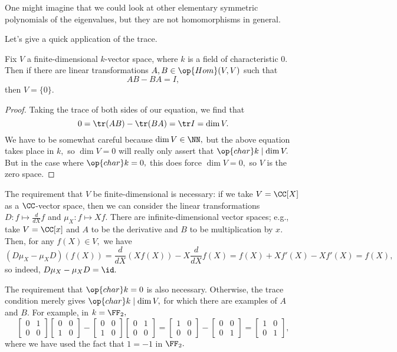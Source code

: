 \documentclass[../notes.tex]{subfiles}
\begin{document}
\begin{remark}
	One might imagine that we could look at other elementary symmetric polynomials of the eigenvalues, but they are not homomorphisms in general.
\end{remark}
Let's give a quick application of the trace.
\begin{theorem}
	Fix $V$ a finite-dimensional $k$-vector space, where $k$ is a field of characteristic $0.$ Then if there are linear transformations $A,B\in\op{Hom}(V,V)$ such that
	\[AB-BA=I,\]
	then $V=\{0\}.$
\end{theorem}
\begin{proof}
	Taking the trace of both sides of our equation, we find that
	\[0=\tr (AB)-\tr (BA)=\tr I=\dim V.\]
	We have to be somewhat careful because $\dim V\in\NN,$ but the above equation takes place in $k,$ so $\dim V=0$ will really only assert that $\op{char}k\mid\dim V.$ But in the case where $\op{char}k=0,$ this does force $\dim V=0,$ so $V$ is the zero space.
\end{proof}
\begin{example}
	The requirement that $V$ be finite-dimensional is necessary: if we take $V=\CC[X]$ as a $\CC$-vector space, then we can consider the linear transformations $D:f\mapsto\frac d{dX}f$ and $\mu_X:f\mapsto Xf.$ There are infinite-dimensional vector spaces; e.g., take $V=\CC[x]$ and $A$ to be the derivative and $B$ to be multiplication by $x.$ Then, for any $f(X)\in V,$ we have
	\[(D\mu_X-\mu_XD)(f(X))=\frac d{dX}(Xf(X))-X\frac d{dX}f(X)=f(X)+Xf'(X)-Xf'(X)=f(X),\]
	so indeed, $D\mu_X-\mu_XD=\id.$
\end{example}
\begin{example}[Nir]
	The requirement that $\op{char}k=0$ is also necessary. Otherwise, the trace condition merely gives $\op{char}k\mid\dim V,$ for which there are examples of $A$ and $B.$ For example, in $k=\FF_2,$
	\[\begin{bmatrix}
		0 & 1 \\
		0 & 0
	\end{bmatrix}\begin{bmatrix}
		0 & 0 \\
		1 & 0
	\end{bmatrix}-\begin{bmatrix}
		0 & 0 \\
		1 & 0
	\end{bmatrix}\begin{bmatrix}
		0 & 1 \\
		0 & 0
	\end{bmatrix}=\begin{bmatrix}
		1 & 0 \\
		0 & 0
	\end{bmatrix}-\begin{bmatrix}
		0 & 0 \\
		0 & 1
	\end{bmatrix}=\begin{bmatrix}
		1 & 0 \\
		0 & 1
	\end{bmatrix},\]
	where we have used the fact that $1=-1$ in $\FF_2.$
\end{example}
\end{document}
